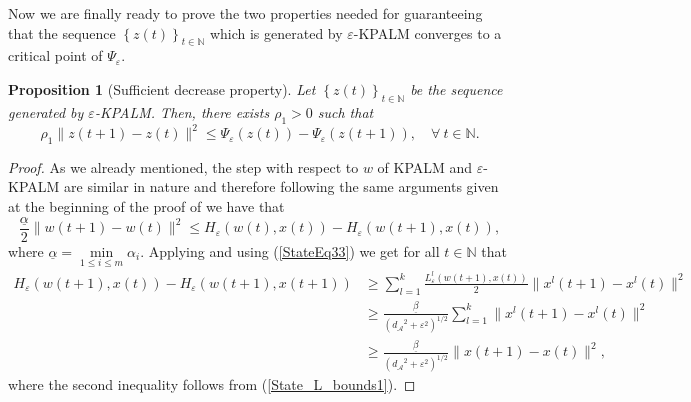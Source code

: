 \documentclass[12pt]{article}
\numberwithin{equation}{section}
\newtheorem{proposition}{Proposition}[section]
\begin{document}
Now we are finally ready to prove the two properties needed for guaranteeing that the sequence $\left\lbrace z(t) \right\rbrace_{t \in \mathbb{N}}$ which is generated by $\varepsilon$-KPALM converges to a critical point of $\Psi_{\varepsilon}$.

\begin{proposition}[Sufficient decrease property]
Let $\left\lbrace z(t) \right\rbrace_{t \in \mathbb{N}}$ be the sequence generated by $\varepsilon$-KPALM. Then, there exists $\rho_1 > 0$ such that 
\begin{equation*}
	\rho_1 \|z(t+1) - z(t)\|^2 \leq \Psi_{\varepsilon}(z(t)) - \Psi_{\varepsilon}(z(t+1)), \quad \forall \: t \in \mathbb{N} .
\end{equation*}
\end{proposition}

\begin{proof}
As we already mentioned, the step with respect to $w$ of KPALM and $\varepsilon$-KPALM  are similar in nature and therefore following the same arguments given at the beginning of the proof of  we have that
\begin{equation}
	\frac{\underline{\alpha}}{2} \|w(t+1) - w(t)\|^2 \leq H_{\varepsilon}(w(t),x(t)) - H_{\varepsilon}(w(t+1),x(t)) , \label{StateEq37}
\end{equation}
where $\underline{\alpha} = \min\limits_{1 \leq i \leq m} \alpha_i $.
Applying  and using (\ref{StateEq33}) we get for all $t \in \mathbb{N}$ that
\begin{align}
	H_{\varepsilon}(w(t+1),x(t)) - H_{\varepsilon}(w(t+1),x(t+1)) 
	&\geq \sum\limits_{l=1}^{k} \frac{L^l_{\varepsilon}(w(t+1),x(t))}{2} \|x^l(t+1)-x^l(t)\|^2 \\
	&\geq \frac{\underline{\beta}}{\left( {d_{\mathcal{A}}}^2 + {\varepsilon}^2 \right)^{1/2}} \sum\limits _{l=1}^{k} \|x^l(t+1)-x^l(t)\|^2 \\
	&\geq \frac{\underline{\beta}}{\left( {d_{\mathcal{A}}}^2 + {\varepsilon}^2 \right)^{1/2}} \|x(t+1)-x(t)\|^2 , \label{StateEq39}
\end{align}
where the second inequality follows from (\ref{State_L_bounds1}).

\end{proof}
\end{document}
